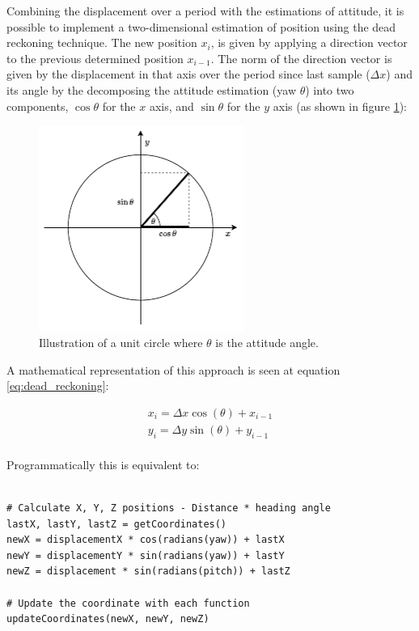 Combining the displacement over a period with the estimations of attitude, it is possible to implement a two-dimensional estimation of position using the dead reckoning technique. The new position $x_i$, is given by applying a direction vector to the previous determined position $x_{i-1}$. The norm of the direction vector is given by the displacement in that axis over the period since last sample ($\Delta x$) and its angle by the decomposing the attitude estimation (yaw $\theta$) into two components, $\cos \theta$ for the $x$ axis, and $\sin \theta$ for the $y$ axis (as shown in figure \ref{fig:trignometric}):

\begin{figure}[!h]
    \centering
    \includegraphics[width=0.6\textwidth]{figures/trignometric.pdf}
    \caption{Illustration of a unit circle where $\theta$ is the attitude angle.}
    \label{fig:trignometric}
\end{figure}

A mathematical representation of this approach is seen at equation \ref{eq:dead_reckoning}:

\begin{equation}
    \begin{gathered}
        x_i = \Delta x \cos (\theta) + x_{i-1} \\
        y_i = \Delta y \sin (\theta) + y_{i-1} \\
    \end{gathered}
    \label{eq:dead_reckoning}
\end{equation}

Programmatically this is equivalent to:

\lstset{language=Python}
\begin{lstlisting}[frame=single]  % Start your code-block
    
# Calculate X, Y, Z positions - Distance * heading angle
lastX, lastY, lastZ = getCoordinates()
newX = displacementX * cos(radians(yaw)) + lastX
newY = displacementY * sin(radians(yaw)) + lastY
newZ = displacement * sin(radians(pitch)) + lastZ 

# Update the coordinate with each function
updateCoordinates(newX, newY, newZ)
    
\end{lstlisting}

